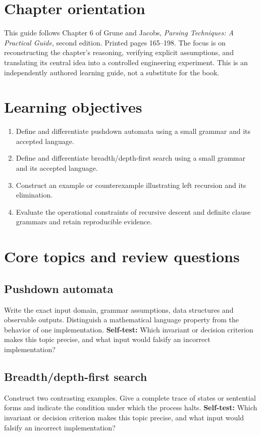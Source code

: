 \documentclass[11pt,letterpaper]{article}
\begin{document}
\makedoctitle\makedocsummary
\tableofcontents\clearpage
\section{Chapter orientation}
This guide follows Chapter 6 of Grune and Jacobs, \emph{Parsing Techniques: A Practical Guide}, second edition. Printed pages 165--198. The focus is on reconstructing the chapter's reasoning, verifying explicit assumptions, and translating its central idea into a controlled engineering experiment. This is an independently authored learning guide, not a substitute for the book.
\section{Learning objectives}
\begin{enumerate}
\item Define and differentiate pushdown automata using a small grammar and its accepted language.
\item Define and differentiate breadth/depth-first search using a small grammar and its accepted language.
\item Construct an example or counterexample illustrating left recursion and its elimination.
\item Evaluate the operational constraints of recursive descent and definite clause grammars and retain reproducible evidence.
\end{enumerate}
\section{Core topics and review questions}
\subsection{Pushdown automata}
Write the exact input domain, grammar assumptions, data structures and observable outputs. Distinguish a mathematical language property from the behavior of one implementation.
\textbf{Self-test:} Which invariant or decision criterion makes this topic precise, and what input would falsify an incorrect implementation?
\subsection{Breadth/depth-first search}
Construct two contrasting examples. Give a complete trace of states or sentential forms and indicate the condition under which the process halts.
\textbf{Self-test:} Which invariant or decision criterion makes this topic precise, and what input would falsify an incorrect implementation?
\end{document}
